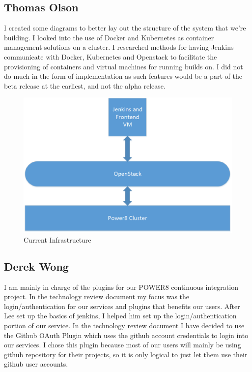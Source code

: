 \documentclass[10pt,onecolumn,journal,draftclsnofoot]{IEEEtran}
\begin{document}
\subsection{Thomas Olson}
I created some diagrams to better lay out the structure of the system that we're building. I looked into the use of Docker and Kubernetes as container management solutions on a cluster. I researched methods for having Jenkins communicate with Docker, Kubernetes and Openstack to facilitate the provisioning of containers and virtual machines for running builds on. I did not do much in the form of implementation as such features would be a part of the beta release at the earliest, and not the alpha release.

\begin{figure}[H]
  \centering
  \includegraphics[width=\textwidth, keepaspectratio]{Current_Infrastructure.eps}
  \caption{Current Infrastructure}
\end{figure}
\subsection{Derek Wong}
I am mainly in charge of the plugins for our POWER8 continuous integration project. In the technology review document my focus was the login/authentication for our services and plugins that benefits our users. After Lee set up the basics of jenkins, I helped him set up the login/authentication portion of our service. In the technology review document I have decided to use the Github OAuth Plugin which uses the github account credentials to login into our services. I chose this plugin because most of our users will mainly be using github repository for their projects, so it is only logical to just let them use their github user accounts.
\end{document}
